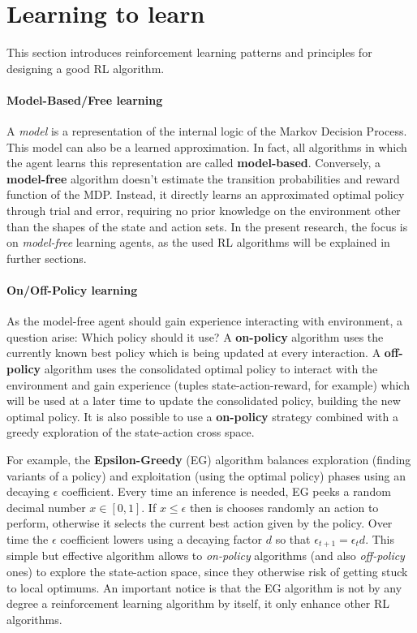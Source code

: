 \section{Learning to learn}

This section introduces reinforcement learning patterns and principles for designing a good RL algorithm.

\paragraph{Model-Based/Free learning}

A \textit{model} is a representation of the internal logic of the Markov Decision Process. This model can also be a learned approximation. In fact, all algorithms in which the agent learns this representation are called \textbf{model-based}. Conversely, a \textbf{model-free} algorithm doesn't estimate the transition probabilities and reward function of the MDP. Instead, it directly learns an approximated optimal policy through trial and error, requiring no prior knowledge on the environment other than the shapes of the state and action sets.
In the present research, the focus is on \textit{model-free} learning agents, as the used RL algorithms will be explained in further sections.

\paragraph{On/Off-Policy learning}

As the model-free agent should gain experience interacting with environment, a question arise: Which policy should it use? A \textbf{on-policy} algorithm uses the currently known best policy which is being updated at every interaction. A \textbf{off-policy} algorithm uses the consolidated optimal policy to interact with the environment and gain experience (tuples state-action-reward, for example) which will be used at a later time to update the consolidated policy, building the new optimal policy. It is also possible to use a \textbf{on-policy} strategy combined with a greedy exploration of the state-action cross space.

For example, the \textbf{Epsilon-Greedy} (EG) \cite{liu2021improving} algorithm balances exploration (finding variants of a policy) and exploitation (using the optimal policy) phases using an decaying $\epsilon$ coefficient.
Every time an inference is needed, EG peeks a random decimal number $x \in [0, 1]$. If $x \leq \epsilon$ then is chooses randomly an action to perform, otherwise it selects the current best action given by the policy.
Over time the $\epsilon$ coefficient lowers using a decaying factor $d$ so that $\epsilon_{t + 1} = \epsilon_{t} d$. This simple but effective algorithm allows to \textit{on-policy} algorithms (and also \textit{off-policy} ones) to explore the state-action space, since they otherwise risk of getting stuck to local optimums.
An important notice is that the EG algorithm is not by any degree a reinforcement learning algorithm by itself, it only enhance other RL algorithms.


